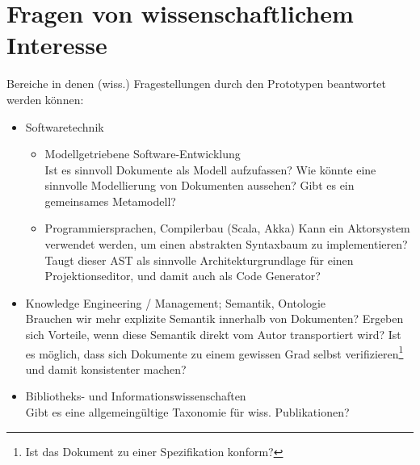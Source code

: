 

\section{Fragen von wissenschaftlichem Interesse}

Bereiche in denen (wiss.) Fragestellungen durch den Prototypen beantwortet werden können:

\begin{itemize}
  \item Softwaretechnik

  \begin{itemize}
    \item Modellgetriebene Software-Entwicklung\\
          Ist es sinnvoll Dokumente als Modell aufzufassen?
          Wie könnte eine sinnvolle Modellierung von Dokumenten aussehen?
          Gibt es ein gemeinsames Metamodell?
    \item Programmiersprachen, Compilerbau (Scala, Akka)
          Kann ein Aktorsystem verwendet werden, um einen abstrakten Syntaxbaum zu implementieren?
          Taugt dieser AST als sinnvolle Architekturgrundlage für einen Projektionseditor, und damit auch als Code Generator?
  \end{itemize}

  \item Knowledge Engineering / Management; Semantik, Ontologie\\
        Brauchen wir mehr explizite Semantik innerhalb von Dokumenten?
        Ergeben sich Vorteile, wenn diese Semantik direkt vom Autor transportiert wird?
        Ist es möglich, dass sich Dokumente zu einem gewissen Grad selbst verifizieren\footnote{Ist das Dokument zu einer Spezifikation konform?} und damit konsistenter machen?

  \item Bibliotheks- und Informationswissenschaften\\
        Gibt es eine allgemeingültige Taxonomie für wiss. Publikationen?
\end{itemize}



